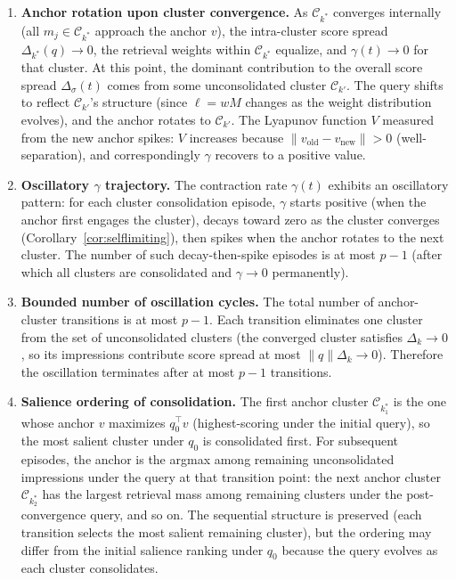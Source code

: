 \begin{theorem}
\begin{enumerate}
\item \textbf{Anchor rotation upon cluster convergence.}  As $\mathcal{C}_{k^*}$ converges internally (all $m_j \in \mathcal{C}_{k^*}$ approach the anchor $v$), the intra-cluster score spread $\Delta_{k^*}(q) \to 0$, the retrieval weights within $\mathcal{C}_{k^*}$ equalize, and $\gamma(t) \to 0$ for that cluster.  At this point, the dominant contribution to the overall score spread $\Delta_\sigma(t)$ comes from some unconsolidated cluster $\mathcal{C}_{k'}$.  The query shifts to reflect $\mathcal{C}_{k'}$'s structure (since $\ell = wM$ changes as the weight distribution evolves), and the anchor rotates to $\mathcal{C}_{k'}$.  The Lyapunov function $V$ measured from the new anchor spikes: $V$ increases because $\|v_{\mathrm{old}} - v_{\mathrm{new}}\| > 0$ (well-separation), and correspondingly $\gamma$ recovers to a positive value.

\item \textbf{Oscillatory $\gamma$ trajectory.}  The contraction rate $\gamma(t)$ exhibits an oscillatory pattern: for each cluster consolidation episode, $\gamma$ starts positive (when the anchor first engages the cluster), decays toward zero as the cluster converges (Corollary~\ref{cor:selflimiting}), then spikes when the anchor rotates to the next cluster.  The number of such decay-then-spike episodes is at most $p - 1$ (after which all clusters are consolidated and $\gamma \to 0$ permanently).

\item \textbf{Bounded number of oscillation cycles.}  The total number of anchor-cluster transitions is at most $p - 1$.  Each transition eliminates one cluster from the set of unconsolidated clusters (the converged cluster satisfies $\Delta_k \to 0$, so its impressions contribute score spread at most $\|q\|\Delta_k \to 0$).  Therefore the oscillation terminates after at most $p - 1$ transitions.

\item \textbf{Salience ordering of consolidation.}  The first anchor cluster $\mathcal{C}_{k^*_1}$ is the one whose anchor $v$ maximizes $q_0^\top v$ (highest-scoring under the initial query), so the most salient cluster under $q_0$ is consolidated first.  For subsequent episodes, the anchor is the argmax among remaining unconsolidated impressions under the query at that transition point: the next anchor cluster $\mathcal{C}_{k^*_2}$ has the largest retrieval mass among remaining clusters under the post-convergence query, and so on.  The sequential structure is preserved (each transition selects the most salient remaining cluster), but the ordering may differ from the initial salience ranking under $q_0$ because the query evolves as each cluster consolidates.


\end{enumerate}
\end{theorem}
